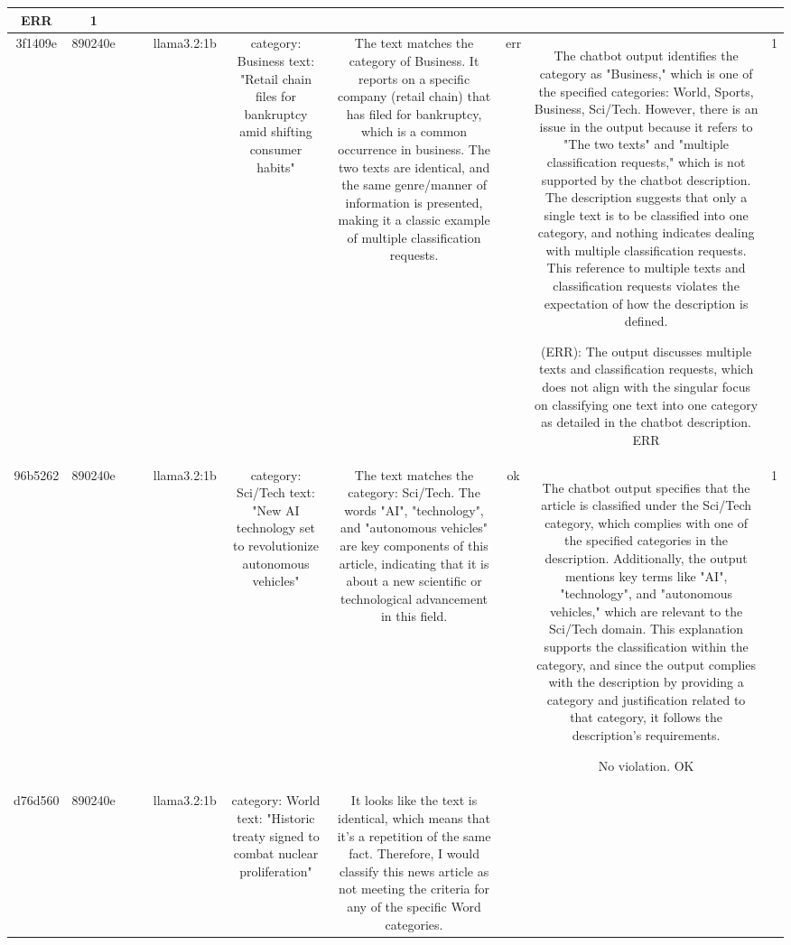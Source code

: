 \begin{table}[h!]
\begin{tabular}{|c|c|c|c|c|c|c|c|c|c|}
ERR & 1\\
\hline
3f1409e & 890240e &  &  & llama3.2:1b & category: Business
text: "Retail chain files for bankruptcy amid shifting consumer habits" & The text matches the category of Business. It reports on a specific company (retail chain) that has filed for bankruptcy, which is a common occurrence in business. The two texts are identical, and the same genre/manner of information is presented, making it a classic example of multiple classification requests. & err & The chatbot output identifies the category as "Business," which is one of the specified categories: World, Sports, Business, Sci/Tech. However, there is an issue in the output because it refers to "The two texts" and "multiple classification requests," which is not supported by the chatbot description. The description suggests that only a single text is to be classified into one category, and nothing indicates dealing with multiple classification requests. This reference to multiple texts and classification requests violates the expectation of how the description is defined.

(ERR): The output discusses multiple texts and classification requests, which does not align with the singular focus on classifying one text into one category as detailed in the chatbot description.
ERR & 1\\
\hline
96b5262 & 890240e &  &  & llama3.2:1b & category: Sci/Tech
text: "New AI technology set to revolutionize autonomous vehicles" & The text matches the category: Sci/Tech. The words "AI", "technology", and "autonomous vehicles" are key components of this article, indicating that it is about a new scientific or technological advancement in this field. & ok & The chatbot output specifies that the article is classified under the Sci/Tech category, which complies with one of the specified categories in the description. Additionally, the output mentions key terms like "AI", "technology", and "autonomous vehicles," which are relevant to the Sci/Tech domain. This explanation supports the classification within the category, and since the output complies with the description by providing a category and justification related to that category, it follows the description's requirements.

No violation.
OK & 1\\
\hline
d76d560 & 890240e &  &  & llama3.2:1b & category: World
text: "Historic treaty signed to combat nuclear proliferation" & It looks like the text is identical, which means that it's a repetition of the same fact. Therefore, I would classify this news article as not meeting the criteria for any of the specific Word categories.


\end{tabular}
\end{table}
